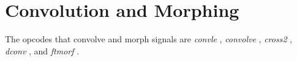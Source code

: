 \begin{comment}
\documentclass[10pt]{article}
\usepackage{fullpage, graphicx, url}
\setlength{\parskip}{1ex}
\setlength{\parindent}{0ex}
\title{Convolution and Morphing}



\begin{tabular}{ccc}
The Alternative Csound Reference Manual & & \\
Previous &Signal Modifiers &Next

\end{tabular}

\end{comment}
\section{Convolution and Morphing}


  The opcodes that convolve and morph signals are \emph{convle}
, \emph{convolve}
, \emph{cross2}
, \emph{dconv}
, and \emph{ftmorf}
. 


\begin{comment}
\begin{tabular}{lcr}
Previous &Home &Next \\
Signal Modifiers &Up &Delay

\end{tabular}



\end{comment}
